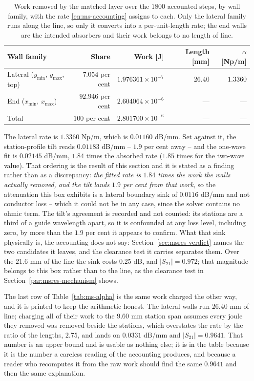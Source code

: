 \begin{table}[H]
  \centering
  \caption{Work removed by the matched layer over the $1800$ accounted steps, by wall family, with the rate
  \eqref{eq:ms-accounting} assigns to each. Only the lateral family runs along the line, so only it converts into
  a per-unit-length rate; the end walls are the intended absorbers and their work belongs to no length of line.}
  \label{tab:ms-acct}
  \small
  \begin{tabular}{@{}lrrrr@{}}
    \toprule
    Wall family & Share & Work [J] & Length [mm] & $\alpha$ [Np/m] \\
    \midrule
    Lateral ($y_{\min}$, $y_{\max}$, top) & $7.054$ per cent & $1.976361\times10^{-7}$ & $26.40$ & $1.3360$ \\
    End ($x_{\min}$, $x_{\max}$)          & $92.946$ per cent & $2.604064\times10^{-6}$ & --- & --- \\
    Total                                 & $100$ per cent & $2.801700\times10^{-6}$ & --- & --- \\
    \bottomrule
  \end{tabular}
\end{table}

The lateral rate is $1.3360$ Np/m, which is $0.01160$ dB/mm. Set against it, the station-profile tilt reads
$0.01183$ dB/mm -- $1.9$ per cent away -- and the one-wave fit is $0.02145$ dB/mm, $1.84$ times the absorbed rate
($1.85$ times for the two-wave value). That ordering is the result of this section and it is stated as a finding
rather than as a discrepancy: \emph{the fitted rate is $1.84$ times the work the walls actually removed, and the
tilt lands $1.9$ per cent from that work}, so the attenuation this box exhibits is a lateral boundary sink of
$0.0116$ dB/mm and not conductor loss -- which it could not be in any case, since the solver contains no ohmic
term. The tilt's agreement is recorded and not counted: its stations are a third of a guide wavelength apart, so it is
confounded at any loss level, including zero, by more than the $1.9$ per cent it appears to confirm. What that sink physically is, the
accounting does not say: Section~\ref{sec:msres-verdict} names the two candidates it leaves, and the clearance
test it carries separates them. Over the $21.6$ mm of the line the sink costs $0.25$ dB, and $|S_{21}| = 0.972$;
that magnitude belongs to this box rather than to the line, as the clearance test in
Section~\ref{par:msres-mechanism} shows.

The last row of Table~\ref{tab:ms-alpha} is the same work charged the other way, and it is printed to keep the
arithmetic honest. The lateral walls run $26.40$ mm of line; charging all of their work to the $9.60$ mm station
span assumes every joule they removed was removed beside the stations, which overstates the rate by the ratio of
the lengths, $2.75$, and lands on $0.0331$ dB/mm and $|S_{21}| = 0.9641$. That number is an upper bound and is
usable as nothing else; it is in the table because it is the number a careless reading of the accounting produces,
and because a reader who recomputes it from the raw work should find the same $0.9641$ and then the same
explanation.

